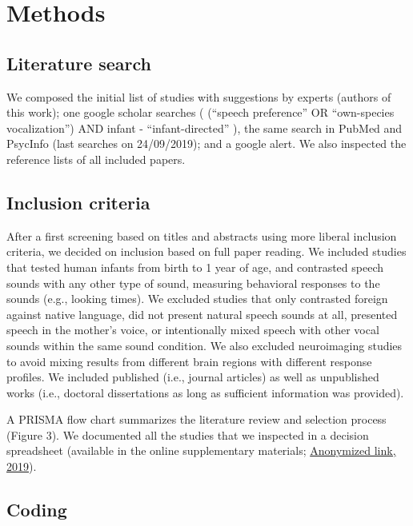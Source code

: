 \documentclass[man,floatsintext]{apa6}
\begin{document}
\section{Methods}\label{methods}

\subsection{Literature search}\label{literature-search}

We composed the initial list of studies with suggestions by experts
(authors of this work); one google scholar searches ( (\enquote{speech
preference} OR \enquote{own-species vocalization}) AND infant -
\enquote{infant-directed} ), the same search in PubMed and PsycInfo
(last searches on 24/09/2019); and a google alert. We also inspected the
reference lists of all included papers.

\subsection{Inclusion criteria}\label{inclusion-criteria}

After a first screening based on titles and abstracts using more liberal
inclusion criteria, we decided on inclusion based on full paper reading.
We included studies that tested human infants from birth to 1 year of
age, and contrasted speech sounds with any other type of sound,
measuring behavioral responses to the sounds (e.g., looking times). We
excluded studies that only contrasted foreign against native language,
did not present natural speech sounds at all, presented speech in the
mother's voice, or intentionally mixed speech with other vocal sounds
within the same sound condition. We also excluded neuroimaging studies
to avoid mixing results from different brain regions with different
response profiles. We included published (i.e., journal articles) as
well as unpublished works (i.e., doctoral dissertations as long as
sufficient information was provided).

A PRISMA flow chart summarizes the literature review and selection
process (Figure 3). We documented all the studies that we inspected in a
decision spreadsheet (available in the online supplementary materials;
\href{https://osf.io/4stz9/?view_only=d0696591ebf34bfc8430f848cd945ca8}{Anonymized
link, 2019}).

\subsection{Coding}\label{coding}
\end{document}
